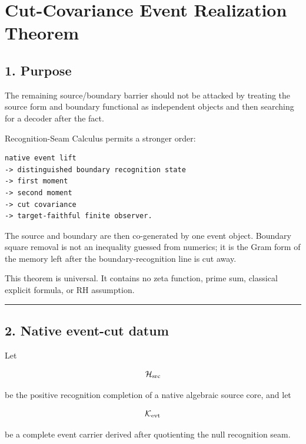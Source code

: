 \hypertarget{cut-covariance-event-realization-theorem}{%
\chapter{Cut-Covariance Event Realization Theorem}\label{cut-covariance-event-realization-theorem}}

\hypertarget{purpose}{%
\section{1. Purpose}\label{purpose}}

The remaining source/boundary barrier should not be attacked by treating the
source form and boundary functional as independent objects and then searching
for a decoder after the fact.

Recognition-Seam Calculus permits a stronger order:

\begin{verbatim}
native event lift
-> distinguished boundary recognition state
-> first moment
-> second moment
-> cut covariance
-> target-faithful finite observer.
\end{verbatim}

The source and boundary are then co-generated by one event object. Boundary
square removal is not an inequality guessed from numerics; it is the Gram form
of the memory left after the boundary-recognition line is cut away.

This theorem is universal. It contains no zeta function, prime sum, classical
explicit formula, or RH assumption.

\begin{center}\rule{0.5\linewidth}{0.5pt}\end{center}

\hypertarget{native-event-cut-datum}{%
\section{2. Native event-cut datum}\label{native-event-cut-datum}}

Let

\[
\mathcal H_{\rm src}
\]

be the positive recognition completion of a native algebraic source core, and
let

\[
\mathcal K_{\rm evt}
\]

be a complete event carrier derived after quotienting the null recognition
seam.

